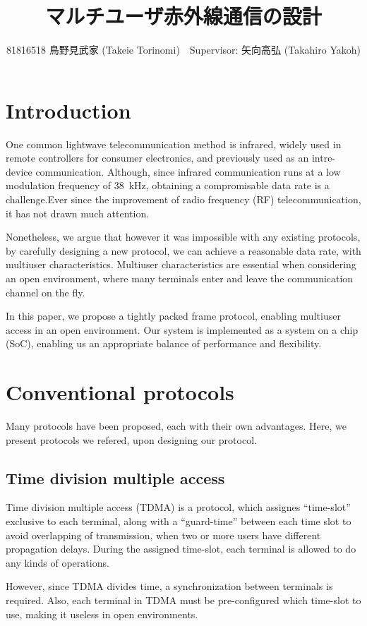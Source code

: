 ﻿\documentclass[twocolumn,9pt]{ltjsarticle}
\title{マルチユーザ赤外線通信の設計}
\author{81816518 鳥野見武家 (Takeie Torinomi)　Supervisor: 矢向高弘 (Takahiro Yakoh)}
\begin{document}
\maketitle
\section{Introduction}
One common lightwave telecommunication method is infrared, widely used in remote controllers for consumer electronics, and previously used as an intre-device communication.
Although, since infrared communication runs at a low modulation frequency of \SI{38}{kHz}, obtaining a compromisable data rate is a challenge.Ever since the improvement of radio frequency (RF) telecommunication, it has not drawn much attention.

Nonetheless, we argue that however it was impossible with any existing protocols, by carefully designing a new protocol, we can achieve a reasonable data rate, with multiuser characteristics.
Multiuser characteristics are essential when considering an open environment, where many terminals enter and leave the communication channel on the fly.

In this paper, we propose a tightly packed frame protocol, enabling multiuser access in an open environment.
Our system is implemented as a system on a chip (SoC), enabling us an appropriate balance of performance and flexibility.

\section{Conventional protocols}
Many protocols have been proposed, each with their own advantages.
Here, we present protocols we refered, upon designing our protocol.

\subsection{Time division multiple access}
Time division multiple access (TDMA) is a protocol, which assignes ``time-slot'' exclusive to each terminal, along with a ``guard-time'' between each time slot to avoid overlapping of transmission, when two or more users have different propagation delays.
During the assigned time-slot, each terminal is allowed to do any kinds of operations.

However, since TDMA divides time, a synchronization between terminals is required.
Also, each terminal in TDMA must be pre-configured which time-slot to use, making it useless in open environments.
\end{document}
